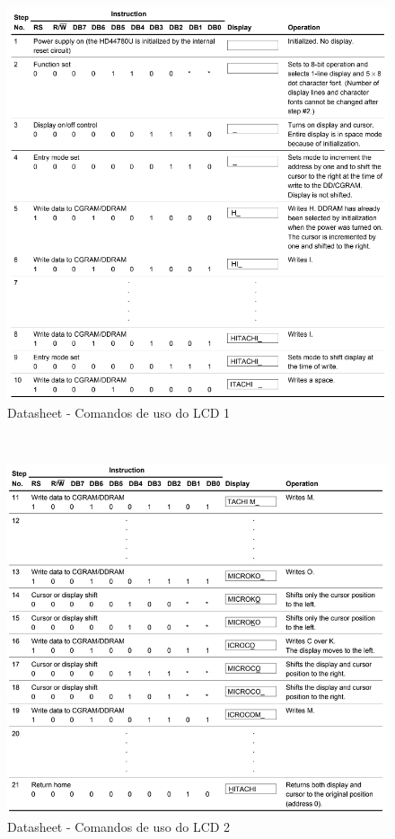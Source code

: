 \documentclass[14pt, oneside]{book}
\theoremstyle{definition}
\begin{document}
                \begin{figure}[H]
                    \centering
                    \includegraphics[scale=1]{lcd2.png}
                    \caption{Datasheet - Comandos de uso do LCD 1}
                    \label{lcd2}
                \end{figure} \\
                
                \begin{figure}[H]
                    \centering
                    \includegraphics[scale=1]{lcd3.png}
                    \caption{Datasheet - Comandos de uso do LCD 2}
                    \label{lcd3}
                \end{figure} \\
                
\end{document}
